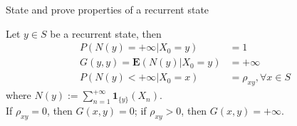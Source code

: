 \documentclass[11pt]{article}
\newcommand{\expect}[1]{\mathbf{E}(#1)}
\newcommand{\indicator}{\mathbf{1}}
\newcommand*{\xfield}[1]{\begin{mdframed}\centering #1\end{mdframed}\bigskip}
\newenvironment{field}{}{}
\newenvironment{note}{}{}
\begin{document}
%
\begin{note}
  \xfield{State and prove properties of a recurrent state}
  \begin{field}
    Let \(y \in S\) be a recurrent state, then
    \begin{align*}
      P(N(y) = +\infty | X_0 = y) & = 1 \\
      G(y,y) = \expect{N(y) | X_0 = y} & = + \infty \\
      P(N(y) < +\infty | X_0 = x) & = \rho_{xy}, \forall x \in S
    \end{align*}
    where \(N(y) := \sum_{n=1}^{+\infty} \indicator_{\{y\}}(X_n)\).\\

    If \(\rho_{xy} = 0\), then \(G(x,y) = 0\); if \(\rho_{xy} > 0\),
    then \(G(x,y) = +\infty\).
  \end{field}
\end{note}
\end{document}
